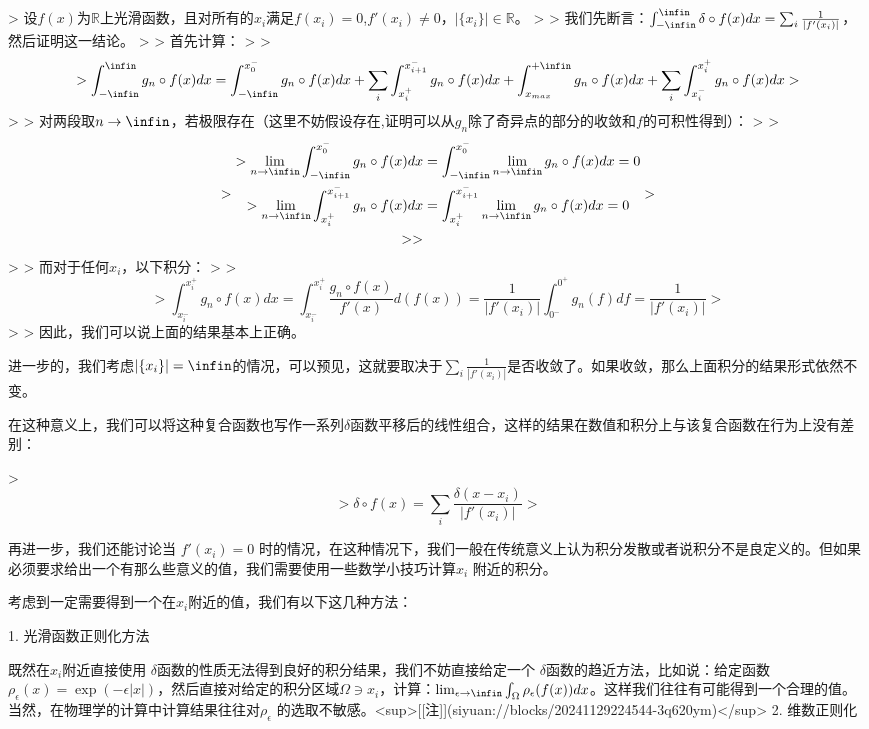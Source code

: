 \documentclass[lang=cn,10pt,newtx,bibend=biber,device=pad]{elegantbook}
\begin{document}
> 设$f(x)$为$\mathbb{R}$上光滑函数，且对所有的$x_i$满足$f(x_i) = 0$,$f'(x_i) \neq 0，|\{x_i\}| \in\mathbb{R}$。
>
> 我们先断言：$\int_{-\infin}^{\infin} \delta\circ f(x) dx = \sum_i \frac{1}{|f'(x_i)|}$，然后证明这一结论。
>
> 首先计算：
>
> $$
> \int_{-\infin}^{\infin} g_n\circ f(x) dx = \int_{-\infin}^{x^-_0} g_n\circ f(x) dx+\sum_i \int_{x^+_i}^{x^-_{i+1}} g_n\circ f(x) dx + \int^{+\infin}_{x_{max}} g_n\circ f(x) dx + \sum_i \int_{x_i^-}^{x_i^+} g_n\circ f(x) dx
> $$
>
> 对两段取$n\rightarrow \infin$，若极限存在（这里不妨假设存在,证明可以从$g_n$除了奇异点的部分的收敛和$f$的可积性得到）：
>
> $$
> \begin{align*}
> \lim_{n\rightarrow\infin}\int_{-\infin}^{x^-_0} g_n\circ f(x) dx &= \int_{-\infin}^{x^-_0}\lim_{n\rightarrow\infin}g_n\circ f(x) dx = 0\\
> \lim_{n\rightarrow\infin}\int_{x^+_i}^{x^-_{i+1}} g_n\circ f(x) dx &= \int_{x^+_i}^{x^-_{i+1}} \lim_{n\rightarrow\infin} g_n\circ f(x) dx = 0\\
>
> \end{align*}
> $$
>
> 而对于任何$x_i$，以下积分：
>
> $$
> \int_{x_i^-}^{x_i^+} g_n\circ f(x) dx = \int_{x_i^-}^{x_i^+} \frac{g_n\circ f(x)}{f'(x)}d(f(x))=\frac{1}{|f'(x_i)|}\int_{0^-}^{0^+} g_n(f) df = \frac{1}{|f'(x_i)|}
> $$
>
> 因此，我们可以说上面的结果基本上正确。

进一步的，我们考虑$|\{x_i\}|=\infin$的情况，可以预见，这就要取决于$\sum_i\frac{1}{|f'(x_i)|}$是否收敛了。如果收敛，那么上面积分的结果形式依然不变。

在这种意义上，我们可以将这种复合函数也写作一系列$\delta$函数平移后的线性组合，这样的结果在数值和积分上与该复合函数在行为上没有差别：

> $$
> \delta\circ f(x) = \sum_i \frac{\delta(x-x_i)}{|f'(x_i)|}
> $$

再进一步，我们还能讨论当 $f'(x_i)=0$ 时的情况，在这种情况下，我们一般在传统意义上认为积分发散或者说积分不是良定义的。但如果必须要求给出一个有那么些意义的值，我们需要使用一些数学小技巧计算$x_i$ 附近的积分。

考虑到一定需要得到一个在$x_i$附近的值，我们有以下这几种方法：

1. 光滑函数正则化方法

    既然在$x_i$附近直接使用 $\delta$函数的性质无法得到良好的积分结果，我们不妨直接给定一个 $\delta$函数的趋近方法，比如说：给定函数$\rho_\epsilon(x) = \exp(-\epsilon|x|)$，然后直接对给定的积分区域$\Omega \owns x_i$，计算：$\lim_{\epsilon\rightarrow \infin} \int_{\Omega} \rho_\epsilon(f(x)) dx$。这样我们往往有可能得到一个合理的值。当然，在物理学的计算中计算结果往往对$\rho_\epsilon$ 的选取不敏感。<sup>[[注]](siyuan://blocks/20241129224544-3q620ym)</sup>
2. 维数正则化
\end{document}
